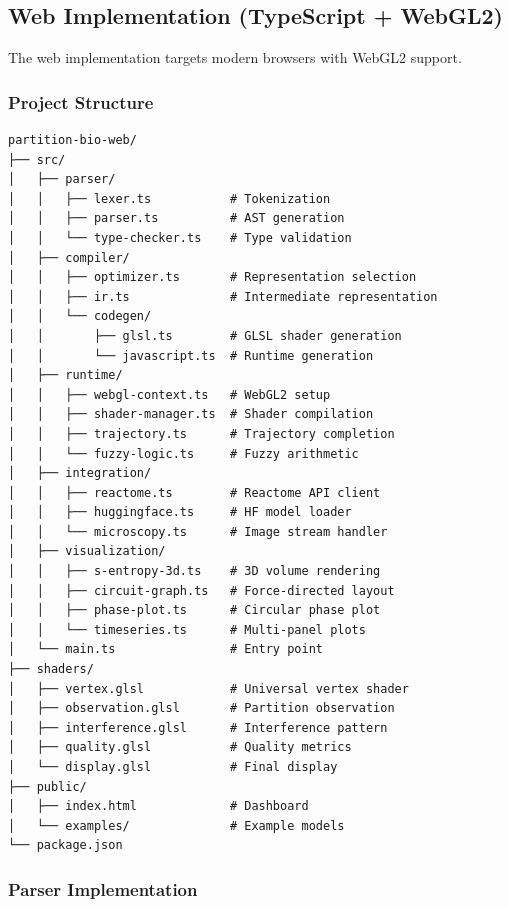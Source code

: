 \documentclass[12pt,a4paper]{article}
\begin{document}
\subsection{Web Implementation (TypeScript + WebGL2)}

The web implementation targets modern browsers with WebGL2 support.

\subsubsection{Project Structure}

\begin{lstlisting}[basicstyle=\ttfamily\small]
partition-bio-web/
├── src/
│   ├── parser/
│   │   ├── lexer.ts           # Tokenization
│   │   ├── parser.ts          # AST generation
│   │   └── type-checker.ts    # Type validation
│   ├── compiler/
│   │   ├── optimizer.ts       # Representation selection
│   │   ├── ir.ts              # Intermediate representation
│   │   └── codegen/
│   │       ├── glsl.ts        # GLSL shader generation
│   │       └── javascript.ts  # Runtime generation
│   ├── runtime/
│   │   ├── webgl-context.ts   # WebGL2 setup
│   │   ├── shader-manager.ts  # Shader compilation
│   │   ├── trajectory.ts      # Trajectory completion
│   │   └── fuzzy-logic.ts     # Fuzzy arithmetic
│   ├── integration/
│   │   ├── reactome.ts        # Reactome API client
│   │   ├── huggingface.ts     # HF model loader
│   │   └── microscopy.ts      # Image stream handler
│   ├── visualization/
│   │   ├── s-entropy-3d.ts    # 3D volume rendering
│   │   ├── circuit-graph.ts   # Force-directed layout
│   │   ├── phase-plot.ts      # Circular phase plot
│   │   └── timeseries.ts      # Multi-panel plots
│   └── main.ts                # Entry point
├── shaders/
│   ├── vertex.glsl            # Universal vertex shader
│   ├── observation.glsl       # Partition observation
│   ├── interference.glsl      # Interference pattern
│   ├── quality.glsl           # Quality metrics
│   └── display.glsl           # Final display
├── public/
│   ├── index.html             # Dashboard
│   └── examples/              # Example models
└── package.json
\end{lstlisting}

\subsubsection{Parser Implementation}
\end{document}
